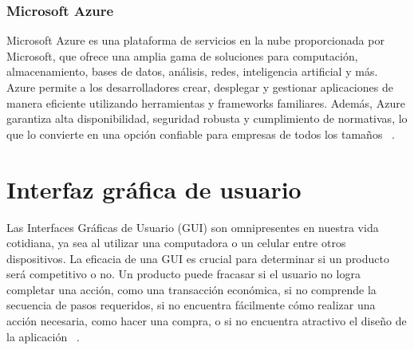 \subsubsection{Microsoft Azure}
Microsoft Azure es una plataforma de servicios en la nube proporcionada por Microsoft, que ofrece una amplia gama de soluciones para computación, almacenamiento, bases de datos, análisis, redes, inteligencia artificial y más. Azure permite a los desarrolladores crear, desplegar y gestionar aplicaciones de manera eficiente utilizando herramientas y frameworks familiares. Además, Azure garantiza alta disponibilidad, seguridad robusta y cumplimiento de normativas, lo que lo convierte en una opción confiable para empresas de todos los tamaños ~\cite{microsoft_azure}. 

\section{Interfaz gráfica de usuario}
Las Interfaces Gráficas de Usuario (GUI) son omnipresentes en nuestra vida cotidiana, ya sea al utilizar una computadora o un celular entre otros dispositivos. La eficacia de una GUI es crucial para determinar si un producto será competitivo o no. Un producto puede fracasar si el usuario no logra completar una acción, como una transacción económica, si no comprende la secuencia de pasos requeridos, si no encuentra fácilmente cómo realizar una acción necesaria, como hacer una compra, o si no encuentra atractivo el diseño de la aplicación ~\cite{interfazAlbornoz}.

